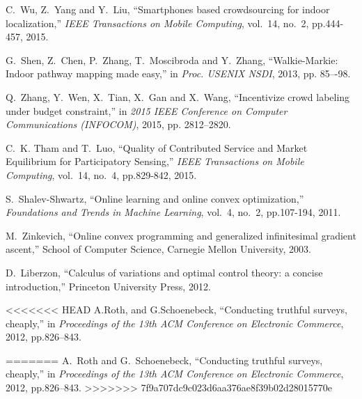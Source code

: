 \documentclass[10pt,conference,compsocconf,letterpaper]{IEEEtran}
\begin{document}
\begin{thebibliography}{99}
C.~Wu, Z.~Yang and Y.~Liu, ``Smartphones based crowdsourcing for indoor localization,'' \emph{IEEE Transactions on Mobile Computing}, vol.~14, no.~2, pp.444-457, 2015.

G.~Shen, Z.~Chen, P.~Zhang, T.~Moscibroda and Y.~Zhang, ``Walkie-Markie: Indoor pathway mapping made easy,'' in \emph{Proc. USENIX NSDI}, 2013, pp. 85–-98.

Q.~Zhang, Y.~Wen, X.~Tian, X.~Gan and X.~Wang, ``Incentivize crowd labeling under budget constraint,'' in \emph{2015 IEEE Conference on Computer Communications (INFOCOM)}, 2015, pp. 2812--2820.

C.~K. Tham and T.~Luo, ``Quality of Contributed Service and Market Equilibrium for Participatory Sensing,'' \emph{IEEE Transactions on Mobile Computing}, vol.~14, no.~4, pp.829-842, 2015.

S.~Shalev-Shwartz, ``Online learning and online convex optimization,'' \emph{Foundations and Trends in Machine Learning}, vol.~4, no.~2, pp.107-194, 2011.

M.~Zinkevich, ``Online convex programming and generalized infinitesimal gradient ascent,'' School of Computer Science, Carnegie Mellon University, 2003.

D.~Liberzon, ``Calculus of variations and optimal control theory: a concise introduction,'' Princeton University Press, 2012.

<<<<<<< HEAD
A.Roth, and G.Schoenebeck, ``Conducting truthful surveys, cheaply,'' in \emph{Proceedings of the 13th ACM Conference on Electronic Commerce}, 2012, pp.826--843.

\bibitem{}

=======
A.~Roth and G.~Schoenebeck, ``Conducting truthful surveys, cheaply,'' in \emph{Proceedings of the 13th ACM Conference on Electronic Commerce}, 2012, pp.826--843.
>>>>>>> 7f9a707dc9c023d6aa376ae8f39b02d28015770e

\end{thebibliography}
\end{document}
